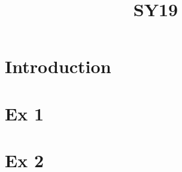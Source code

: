 \documentclass[]{report}
\title{SY19}
\author{}
\begin{document}
\maketitle

\begin{abstract}

\end{abstract}

\part{Introduction}

\part{Ex 1}

\part{Ex 2}
\end{document}
